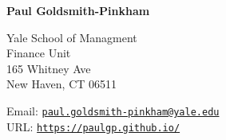 \documentclass[letterpaper]{article}
\begin{document}
{\huge\bf  Paul Goldsmith-Pinkham}

\bigskip

Yale School of Managment\\
Finance Unit\\
165 Whitney Ave\\
New Haven, CT 06511
\medskip



Email: \href{mailto:paul.goldsmith-pinkham@yale.edu}{\tt paul.goldsmith-pinkham@yale.edu} \\
URL: \href{http://https://paulgp.github.io//}{\tt https://paulgp.github.io/} 

\end{document}

